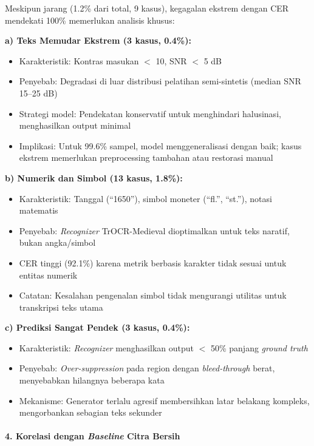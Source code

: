 \documentclass[12pt,a4paper]{article}
\begin{document}
Meskipun jarang (1.2\% dari total, 9 kasus), kegagalan ekstrem dengan CER mendekati 100\% memerlukan analisis khusus:

\textbf{a) Teks Memudar Ekstrem (3 kasus, 0.4\%):}
\begin{itemize}[nosep]
    \item Karakteristik: Kontras masukan $<$ 10, SNR $<$ 5 dB
    \item Penyebab: Degradasi di luar distribusi pelatihan semi-sintetis (median SNR 15--25 dB)
    \item Strategi model: Pendekatan konservatif untuk menghindari halusinasi, menghasilkan output minimal
    \item Implikasi: Untuk 99.6\% sampel, model menggeneralisasi dengan baik; kasus ekstrem memerlukan preprocessing tambahan atau restorasi manual
\end{itemize}

\textbf{b) Numerik dan Simbol (13 kasus, 1.8\%):}
\begin{itemize}[nosep]
    \item Karakteristik: Tanggal (``1650''), simbol moneter (``fl.'', ``st.''), notasi matematis
    \item Penyebab: \textit{Recognizer} TrOCR-Medieval dioptimalkan untuk teks naratif, bukan angka/simbol
    \item CER tinggi (92.1\%) karena metrik berbasis karakter tidak sesuai untuk entitas numerik
    \item Catatan: Kesalahan pengenalan simbol tidak mengurangi utilitas untuk transkripsi teks utama
\end{itemize}

\textbf{c) Prediksi Sangat Pendek (3 kasus, 0.4\%):}
\begin{itemize}[nosep]
    \item Karakteristik: \textit{Recognizer} menghasilkan output $<$ 50\% panjang \textit{ground truth}
    \item Penyebab: \textit{Over-suppression} pada region dengan \textit{bleed-through} berat, menyebabkan hilangnya beberapa kata
    \item Mekanisme: Generator terlalu agresif membersihkan latar belakang kompleks, mengorbankan sebagian teks sekunder
\end{itemize}

\paragraph{4. Korelasi dengan \textit{Baseline} Citra Bersih}
\end{document}
